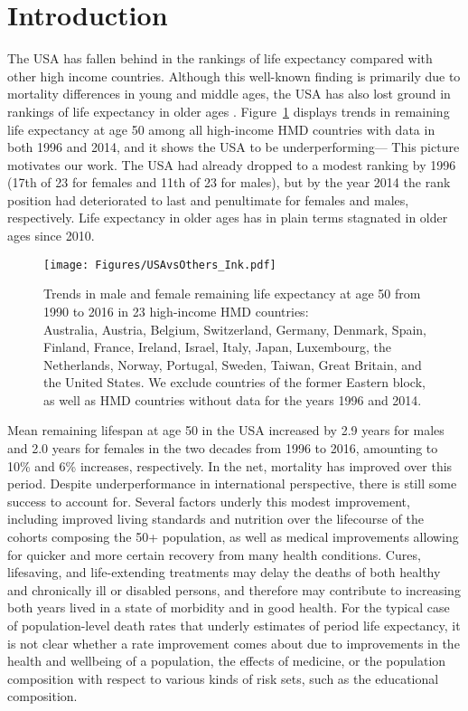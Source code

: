 \section{Introduction}
The USA has fallen behind in the rankings of life expectancy compared with other high income countries. Although this well-known finding is primarily due to mortality differences in young and middle ages, the USA has also lost ground in rankings of life expectancy in older ages \citep{HMD}. Figure~\ref{fig:uslose} displays trends in remaining life expectancy at age 50 among all high-income HMD countries with data in both 1996 and 2014, and it shows the USA to be underperforming--- This picture motivates our work. The USA had already dropped to a modest ranking by 1996 (17th of 23 for females and 11th of 23 for males), but by the year 2014 the rank position had deteriorated to last and penultimate for females and males, respectively. Life expectancy in older ages has in plain terms stagnated in older ages since 2010. 

\begin{figure}[ht!]
\centering
\texttt{[image: Figures/USAvsOthers\_Ink.pdf]}
\caption{Trends in male and female remaining life expectancy at age 50 from 1990 to 2016 in 23 high-income HMD countries:  \\ \footnotesize Australia, Austria, Belgium, Switzerland, Germany, Denmark, Spain, Finland, France, Ireland, Israel, Italy, Japan, Luxembourg, the Netherlands, Norway, Portugal, Sweden, Taiwan, Great Britain, and the United States. We exclude countries of the former Eastern block, as well as HMD countries without data for the years 1996 and 2014.}
\label{fig:uslose}
\end{figure}

Mean remaining lifespan at age 50 in the USA increased by 2.9 years for males and 2.0 years for females in the two decades from 1996 to 2016, amounting to 10\% and 6\% increases, respectively. In the net, mortality has improved over this period. Despite underperformance in international perspective, there is still some success to account for. Several factors underly this modest improvement, including improved living standards and nutrition over the lifecourse of the cohorts composing the 50+ population, as well as medical improvements allowing for quicker and more certain recovery from many health conditions. Cures, lifesaving, and life-extending treatments may delay the deaths of both healthy and chronically ill or disabled persons, and therefore may contribute to increasing both years lived in a state of morbidity and in good health. For the typical case of population-level death rates that underly estimates of period life expectancy, it is not clear whether a rate improvement comes about due to improvements in the health and wellbeing of a population, the effects of medicine, or the population composition with respect to various kinds of risk sets, such as the educational composition. 

